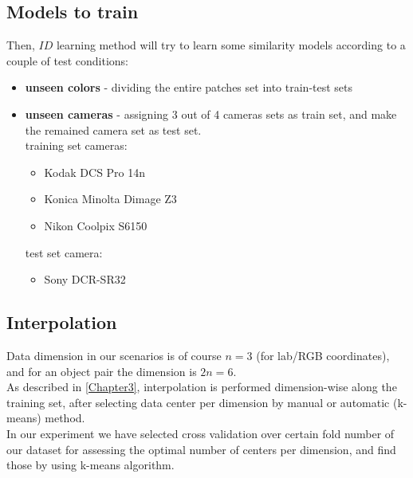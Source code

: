 \subsection{Models to train}
Then, $ID$ learning method will try to learn some similarity models according to a couple of test conditions:

\begin{itemize}
	\item \textbf{unseen colors} - dividing the entire patches set into train-test sets
	\item \textbf{unseen cameras} - assigning 3 out of 4 cameras sets as train set, and make the remained camera set as test set. \\
		training set cameras:
		\begin{itemize}
			\item Kodak DCS	Pro 14n
			\item Konica Minolta Dimage Z3
			\item Nikon Coolpix S6150
		\end{itemize}	
		
		test set camera:	
		\begin{itemize}
			\item Sony DCR-SR32
		\end{itemize}
		
\end{itemize}

\subsection{Interpolation}
Data dimension in our scenarios is of course $n=3$ (for lab/RGB \cite{RGB} coordinates), and for an object pair the dimension is $2n=6$. \\
As described in \ref{Chapter3}, interpolation is performed dimension-wise along the training set, after selecting data center per dimension by manual or automatic (k-means) method.
\\
In our experiment we have selected cross validation \cite{cross_val} over certain fold number of our dataset for assessing the optimal number of centers per dimension, and find those by using k-means \cite{kmeans} algorithm.


